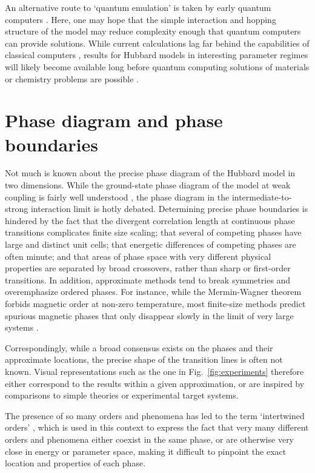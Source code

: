 \documentclass{ar-1col}
\begin{document}
An alternative route to `quantum emulation' is taken by early quantum computers \cite{Somma02}. Here, one may hope that the simple interaction and hopping structure of the model may reduce complexity enough that quantum computers can provide solutions. While current calculations lag far behind the capabilities of classical computers \cite{Arute20}, results for Hubbard models in interesting parameter regimes will likely become available long before quantum computing solutions of materials or chemistry problems are possible \cite{Wecker15}.

\section{Phase diagram and phase boundaries}
\label{sec:phase_diagram}
Not much is known about the precise phase diagram of the Hubbard model in two dimensions.
While the ground-state phase diagram of the model at weak coupling is fairly well understood \cite{Deng15,Simkovic16}, the phase diagram in the intermediate-to-strong interaction limit is hotly debated. Determining precise phase boundaries is hindered by the fact that the divergent correlation length at continuous phase transitions complicates finite size scaling; that several of competing phases have large and distinct unit cells; that energetic differences of competing phases are often minute; and that areas of phase space with very different physical properties are separated by broad crossovers, rather than sharp or first-order transitions.
In addition, approximate methods tend to break symmetries and overemphasize ordered phases. For instance, while the Mermin-Wagner theorem \cite{Mermin66} forbids magnetic order at non-zero temperature, most finite-size methods predict spurious magnetic phases that only disappear slowly in the limit of very large systems \cite{Maier05B}.

Correspondingly, while a broad consensus exists on the phases and their approximate locations, the precise shape of the transition lines is often not known. Visual representations such as the one in Fig.~\ref{fig:experiments} therefore either correspond to the results within a given approximation, or are inspired by comparisons to simple theories or experimental target systems.

The presence of so many orders and phenomena has led to the term `intertwined orders' \cite{Fradkin15}, which is used in this context to express the fact that very many different orders and phenomena either coexist in the same phase, or are otherwise very close in energy or parameter space, making it difficult to pinpoint the exact location and properties of each phase.
\end{document}
